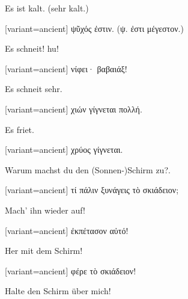 Es ist kalt. (sehr kalt.)

\switchcolumn

\begin{greek}[variant=ancient]%
ψῦχός ἐστιν. (ψ. ἐστι μέγεστον.)

\end{greek}%
\switchcolumn*

Es schneit! hu!

\switchcolumn

\begin{greek}[variant=ancient]%
νίφει· βαβαιάξ!

\end{greek}%
\switchcolumn*

Es schneit sehr.

\switchcolumn

\begin{greek}[variant=ancient]%
χιών γίγνεται πολλή.

\end{greek}%
\switchcolumn*

Es friet.

\switchcolumn

\begin{greek}[variant=ancient]%
χρύος γίγνεται.

\end{greek}%
\switchcolumn*

Warum machst du den (Sonnen-)Schirm zu?.

\switchcolumn

\begin{greek}[variant=ancient]%
τί πάλιν ξυνάγεις τὸ σκιάδειον;

\end{greek}%
\switchcolumn*

Mach' ihn wieder auf!

\switchcolumn

\begin{greek}[variant=ancient]%
ἐκπέτασον αὐτό!

\end{greek}%
\switchcolumn*

Her mit dem Schirm!

\switchcolumn

\begin{greek}[variant=ancient]%
φέρε τὸ σκιάδειον!

\end{greek}%
\switchcolumn*

Halte den Schirm über mich!

